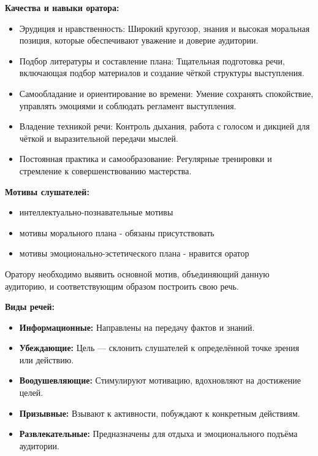 \textbf{Качества и навыки оратора:}
\begin{itemize}
	\item Эрудиция и нравственность: Широкий кругозор, знания и высокая моральная позиция, которые обеспечивают уважение и доверие аудитории.
	
	\item Подбор литературы и составление плана: Тщательная подготовка речи, включающая подбор материалов и создание чёткой структуры выступления.
	
	\item Самообладание и ориентирование во времени: Умение сохранять спокойствие, управлять эмоциями и соблюдать регламент выступления.
	
	\item Владение техникой речи: Контроль дыхания, работа с голосом и дикцией для чёткой и выразительной передачи мыслей.
	
	\item Постоянная практика и самообразование: Регулярные тренировки и стремление к совершенствованию мастерства.
\end{itemize}

\textbf{Мотивы слушателей:}
\begin{itemize}
	\item интеллектуально-познавательные мотивы
	\item мотивы морального плана - обязаны присутствовать
	\item мотивы эмоционально-эстетического плана - нравится оратор
\end{itemize}

Оратору необходимо выявить основной мотив, объединяющий данную аудиторию, и соответствующим образом построить свою речь.

\textbf{Виды речей:}
\begin{itemize}
	\item \textbf{Информационные:} Направлены на передачу фактов и знаний.
	\item \textbf{Убеждающие:} Цель — склонить слушателей к определённой точке зрения или действию.
	\item \textbf{Воодушевляющие:} Стимулируют мотивацию, вдохновляют на достижение целей.
	\item \textbf{Призывные:} Взывают к активности, побуждают к конкретным действиям.
	\item \textbf{Развлекательные:} Предназначены для отдыха и эмоционального подъёма аудитории.
\end{itemize}
